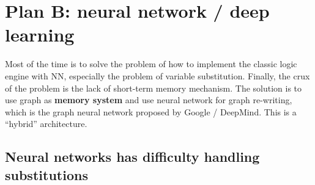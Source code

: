 \documentclass[12pt, orivec]{article}
\begin{document}
\section{Plan B: neural network / deep learning}

Most of the time is to solve the problem of how to implement the classic logic engine with NN, especially the problem of variable substitution. Finally, the crux of the problem is the lack of short-term memory mechanism.
The solution is to use graph as \textbf{memory system} and use neural network for graph re-writing, which is the graph neural network proposed by Google / DeepMind. This is a ``hybrid'' architecture.

\subsection{Neural networks has difficulty handling substitutions}
\label{NN}
\end{document}
